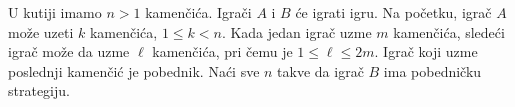 \problem{}
U kutiji imamo $n > 1$ kamenčića. Igrači $A$ i $B$ će igrati igru.
Na početku, igrač $A$ može uzeti $k$ kamenčića, $1 \leq k < n$. Kada jedan igrač uzme $m$ kamenčića, sledeći igrač može da uzme $\ell$ kamenčića, pri čemu je $1 \leq \ell \leq 2 m$.
Igrač koji uzme poslednji kamenčić je pobednik.
Naći sve $n$ takve da igrač $B$ ima pobedničku strategiju.
\solution
\endproblem
